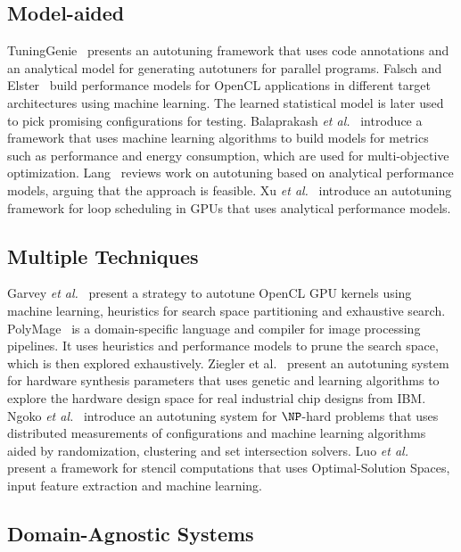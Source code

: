 \subsection{Model-aided}

TuningGenie~\cite{ivanenko2014method} presents an autotuning framework that
uses code annotations and an analytical model for generating autotuners for
parallel programs.  Falsch and Elster~\cite{falch2017machine} build performance
models for OpenCL applications in different target architectures using machine
learning.  The learned statistical model is later used to pick promising
configurations for testing.  Balaprakash \emph{et al.}~\cite{balaprakash2016automomml}
introduce a framework that uses machine learning algorithms to build models for
metrics such as performance and energy consumption, which are used for
multi-objective optimization.  Lang~\cite{lang2017data} reviews work on
autotuning based on analytical performance models, arguing that the approach is
feasible.  Xu \emph{et al.}~\cite{xu2016analytical} introduce an autotuning framework
for loop scheduling in GPUs that uses analytical performance models.

\subsection{Multiple Techniques}

Garvey \emph{et al.}~\cite{garvey2015automatic} present a strategy to autotune OpenCL
GPU kernels using machine learning, heuristics for search space partitioning
and exhaustive search.  PolyMage~\cite{mullapudi2015polymage} is a
domain-specific language and compiler for image processing pipelines. It uses
heuristics and performance models to prune the search space, which is then
explored exhaustively.  Ziegler et
al.~\cite{ziegler2016synthesis,ziegler2016scalable} present an autotuning
system for hardware synthesis parameters that uses genetic and learning
algorithms to explore the hardware design space for real industrial chip
designs from IBM.  Ngoko \emph{et al.}~\cite{ngoko2016automatic} introduce an
autotuning system for $\NP$-hard problems that uses distributed measurements of
configurations and machine learning algorithms aided by randomization,
clustering and set intersection solvers.  Luo \emph{et al.}~\cite{luo2015fast} present
a framework for stencil computations that uses Optimal-Solution Spaces, input
feature extraction and machine learning.

\subsection{Domain-Agnostic Systems}

